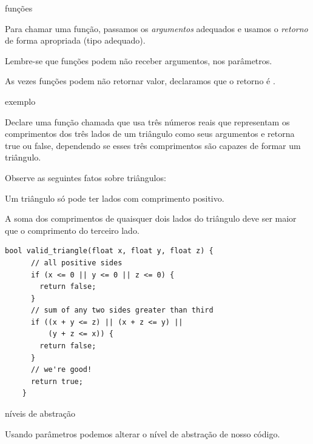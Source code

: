\documentclass{beamer}
\begin{document}
\begin{frame}{funções}
  \framebreak

  Para chamar uma função, passamos os \emph{argumentos} adequados e
  usamos o \emph{retorno} de forma apropriada (tipo adequado).

  Lembre-se que funções podem não receber argumentos, 
  nos parâmetros.

  As vezes funções podem não retornar valor, declaramos que o retorno
  é .

\end{frame}

\begin{frame}{exemplo}

  Declare uma função chamada  que usa três
  números reais que representam os comprimentos dos três lados de um
  triângulo como seus argumentos e retorna true ou false, dependendo
  se esses três comprimentos são capazes de formar um triângulo.

  Observe as seguintes fatos sobre triângulos:

  Um triângulo só pode ter lados com comprimento positivo.

  A soma dos comprimentos de quaisquer dois lados do triângulo deve
  ser maior que o comprimento do terceiro lado.

  \framebreak

  \begin{lstlisting}[style=normalc]
    bool valid_triangle(float x, float y, float z) {
      // all positive sides
      if (x <= 0 || y <= 0 || z <= 0) {
        return false;
      }
      // sum of any two sides greater than third
      if ((x + y <= z) || (x + z <= y) ||
          (y + z <= x)) {
        return false;
      }
      // we're good!
      return true;
    }
  \end{lstlisting}

\end{frame}


\begin{frame}{níveis de abstração}

  

  \framebreak

  Usando parâmetros podemos alterar o nível de abstração de nosso
  código.

  

\end{frame}  
\end{document}
